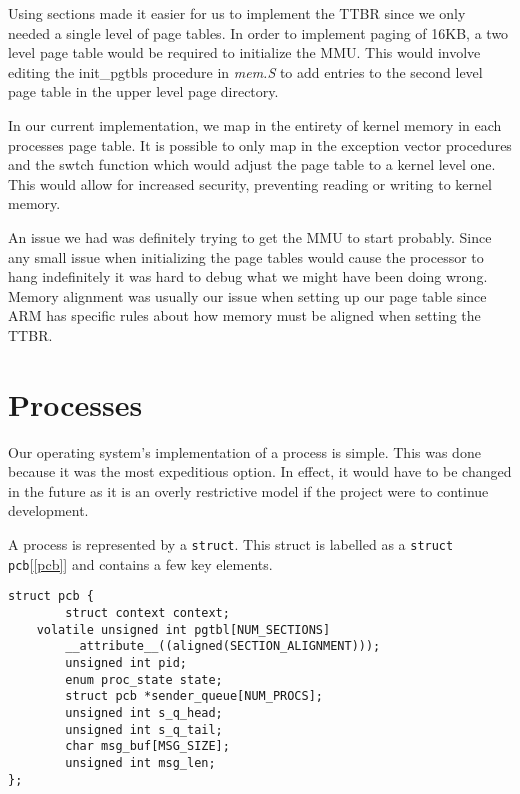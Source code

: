 \documentclass[12pt]{article}
\newcommand{\code}[1]{\colorbox{codegray}{\texttt{\footnotesize{#1}}}}
\begin{document}
Using sections made it easier for us to implement the TTBR since we
only needed a single level of page tables. In order to implement paging
of 16KB, a two level page table would be required to initialize the
MMU\@. This would involve editing the init\_pgtbls procedure in
\textit{mem.S} to add entries to the second level page table in the
upper level page directory.

In our current implementation, we map in the entirety of kernel memory
in each processes page table. It is possible to only map in the
exception vector procedures and the swtch function which would adjust
the page table to a kernel level one.  This would allow for increased
security, preventing reading or writing to kernel memory.

An issue we had was definitely trying to get the MMU to start probably. Since
any small issue when initializing the page tables would cause the processor
to hang indefinitely it was hard to debug what we might have been doing wrong.
Memory alignment was usually our issue when setting up our page table since
ARM has specific rules about how memory must be aligned when setting the TTBR.

\section{Processes}\label{processes}
Our operating system's implementation of a process is simple. This was
done because it was the most expeditious option.  In effect, it
would have to be changed in the future as it is an overly restrictive
model if the project were to continue development.

A process is represented by a \code{struct}.  This struct is
labelled as a \code{struct pcb}[\ref{pcb}] and contains a few key
elements.

\begin{lstlisting}[caption={src/proc.h:pcb}, label={pcb}]
struct pcb {
		struct context context;
	volatile unsigned int pgtbl[NUM_SECTIONS]
		__attribute__((aligned(SECTION_ALIGNMENT)));
		unsigned int pid;
		enum proc_state state;
		struct pcb *sender_queue[NUM_PROCS];
		unsigned int s_q_head;
		unsigned int s_q_tail;
		char msg_buf[MSG_SIZE];
		unsigned int msg_len;
};
\end{lstlisting}
\end{document}
